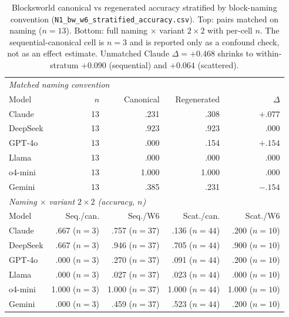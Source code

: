 \begin{table}[t]
\centering
\scriptsize
\caption{Blocksworld canonical vs regenerated accuracy stratified by block-naming
convention (\texttt{N1\_bw\_w6\_stratified\_accuracy.csv}). Top: pairs matched on
naming ($n{=}13$). Bottom: full naming $\times$ variant $2\times 2$ with per-cell $n$.
The sequential-canonical cell is $n{=}3$ and is reported only as a confound check,
not as an effect estimate. Unmatched Claude $\Delta{=}+0.468$ shrinks to within-stratum
$+0.090$ (sequential) and $+0.064$ (scattered).}
\label{tab:bw-stratified}
\begin{tabular}{lrrrr}
\toprule
\multicolumn{5}{l}{\emph{Matched naming convention}} \\
Model & $n$ & Canonical & Regenerated & $\Delta$ \\
\midrule
Claude & 13 & .231 & .308 & $+.077$ \\
DeepSeek & 13 & .923 & .923 & $.000$ \\
GPT-4o & 13 & .000 & .154 & $+.154$ \\
Llama & 13 & .000 & .000 & $.000$ \\
o4-mini & 13 & 1.000 & 1.000 & $.000$ \\
Gemini & 13 & .385 & .231 & $-.154$ \\
\midrule
\multicolumn{5}{l}{\emph{Naming $\times$ variant $2\times 2$ (accuracy, $n$)}} \\
Model & Seq./can. & Seq./W6 & Scat./can. & Scat./W6 \\
\midrule
Claude & .667 ($n{=}3$) & .757 ($n{=}37$) & .136 ($n{=}44$) & .200 ($n{=}10$) \\
DeepSeek & .667 ($n{=}3$) & .946 ($n{=}37$) & .705 ($n{=}44$) & .900 ($n{=}10$) \\
GPT-4o & .000 ($n{=}3$) & .270 ($n{=}37$) & .091 ($n{=}44$) & .200 ($n{=}10$) \\
Llama & .000 ($n{=}3$) & .027 ($n{=}37$) & .023 ($n{=}44$) & .000 ($n{=}10$) \\
o4-mini & 1.000 ($n{=}3$) & 1.000 ($n{=}37$) & 1.000 ($n{=}44$) & 1.000 ($n{=}10$) \\
Gemini & .000 ($n{=}3$) & .459 ($n{=}37$) & .523 ($n{=}44$) & .200 ($n{=}10$) \\
\bottomrule
\end{tabular}
\end{table}
